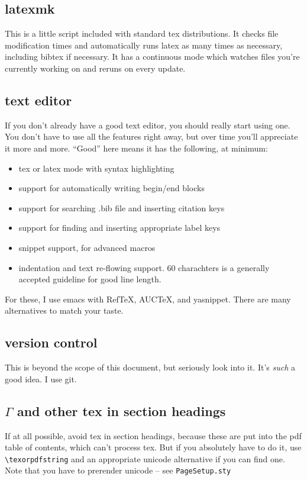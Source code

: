 \documentclass[11pt,oneside,draft]{amsart}
\begin{document}
\subsection{latexmk}\label{sec:latexmk}

This is a little script included with standard tex distributions.  It
checks file modification times and automatically runs latex as many
times as necessary, including bibtex if necessary.  It has a
continuous mode which watches files you're currently working on and
reruns on every update.

\subsection{text editor}

If you don't already have a good text editor, you should really start
using one.  You don't have to use all the features right away, but
over time you'll appreciate it more and more.  ``Good'' here means it
has the following, at minimum:
\begin{itemize}
\item tex or latex mode with syntax highlighting
\item support for automatically writing begin/end blocks
\item support for searching .bib file and inserting citation keys
\item support for finding and inserting appropriate label keys 
\item snippet support, for advanced macros
\item indentation and text re-flowing support.  60 charachters is a
  generally accepted guideline for good line length.
\end{itemize}
For these, I use emacs with RefTeX, AUCTeX, and yasnippet.  There are
many alternatives to match your taste. 

\subsection{version control}

This is beyond the scope of this document, but seriously look into
it.  It's \emph{such} a good idea.  I use git.

\subsection{\texorpdfstring{$\Gamma$}{Γ} and other tex in section headings}
If at all possible, avoid tex in section headings, because these are
put into the pdf table of contents, which can't process tex.  But if
you absolutely have to do it, use \verb|\texorpdfstring| and an
appropriate unicode alternative if you can find one.  Note that you
have to prerender unicode -- see \texttt{PageSetup.sty} 
\end{document}
